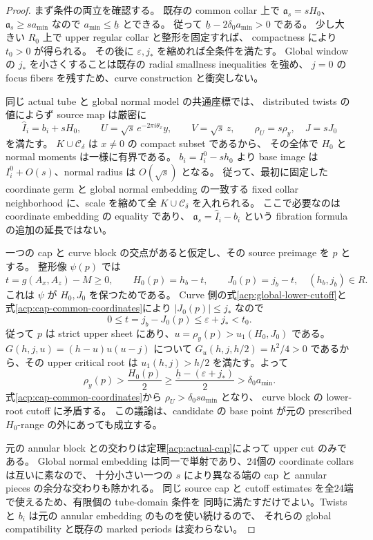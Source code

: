 \begin{proof}
まず条件の両立を確認する。
既存の common collar 上で $\mathfrak a_s=sH_0$、
$\mathfrak a_s\ge sa_{\min}$ なので $a_{\min}\le\underline h$ とできる。
従って $\underline h-2\delta_0a_{\min}>0$ である。
少し大きい $R_0$ 上で upper regular collar と整形を固定すれば、
compactness により $t_0>0$ が得られる。
その後に $\varepsilon,j_*$ を縮めれば全条件を満たす。
Global window の $j_*$ を小さくすることは既存の radial smallness inequalities を強め、
$j=0$ の focus fibers を残すため、curve construction と衝突しない。

同じ actual tube と global normal model の共通座標では、
distributed twists の値によらず source map は厳密に
\begin{equation}\label{acp:cap-common-coordinates}
 \widehat I_i=b_i+sH_0,\qquad
 U=\sqrt{s}\,e^{-2\pi i\theta_x}y,\qquad V=\sqrt{s}\,z,
 \qquad \rho_U=s\rho_y,\quad J=sJ_0
\end{equation}
を満たす。
$K\cup\mathcal C_\delta$ は $x\ne0$ の compact subset であるから、
その全体で $H_0$ と normal moments は一様に有界である。
$b_i=I_i^0-sh_0$ より base image は $I_i^0+O(s)$、normal radius は $O(\sqrt s)$ となる。
従って、最初に固定した coordinate germ と global normal embedding の一致する
fixed collar neighborhood に、scale を縮めて全 $K\cup\mathcal C_\delta$ を入れられる。
ここで必要なのは coordinate embedding の equality であり、
$\mathfrak a_s=\widehat I_i-b_i$ という fibration formula の追加の延長ではない。

一つの cap と curve block の交点があると仮定し、その source preimage を $p$ とする。
整形像 $\psi(p)$ では
\[
 t=g(A_x,A_z)-M\ge0,\qquad
 H_0(p)=h_b-t,\qquad J_0(p)=j_b-t,
 \quad (h_b,j_b)\in R.
\]
これは $\psi$ が $H_0,J_0$ を保つためである。
Curve 側の式\eqref{acp:global-lower-cutoff}と
式\eqref{acp:cap-common-coordinates}により $|J_0(p)|\le j_*$ なので
\[
 0\le t=j_b-J_0(p)\le\varepsilon+j_*<t_0.
\]
従って $p$ は strict upper sheet にあり、$u=\rho_y(p)>u_1(H_0,J_0)$ である。
$G(h,j,u)=(h-u)u(u-j)$ について
$G_u(h,j,h/2)=h^2/4>0$ であるから、その upper critical root は
$u_1(h,j)>h/2$ を満たす。よって
\[
 \rho_y(p)>\frac{H_0(p)}2
 \ge\frac{\underline h-(\varepsilon+j_*)}{2}
 >\delta_0a_{\min}.
\]
式\eqref{acp:cap-common-coordinates}から $\rho_U>\delta_0sa_{\min}$ となり、
curve block の lower-root cutoff に矛盾する。
この議論は、candidate の base point が元の prescribed $H_0$-range の外にあっても成立する。

元の annular block との交わりは定理\ref{acp:actual-cap}によって upper cut のみである。
Global normal embedding は同一で単射であり、24個の coordinate collars は互いに素なので、
十分小さい一つの $s$ により異なる端の cap と annular pieces の余分な交わりも除かれる。
同じ source cap と cutoff estimates を全24端で使えるため、有限個の tube-domain 条件を
同時に満たすだけでよい。Twists と $b_i$ は元の annular embedding のものを使い続けるので、
それらの global compatibility と既存の marked periods は変わらない。
\end{proof}

